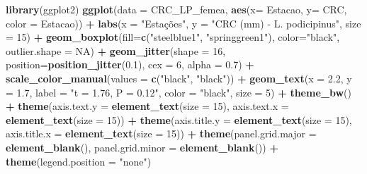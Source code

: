 \documentclass[
]{book}
\newenvironment{Shaded}{\begin{snugshade}}{\end{snugshade}}
\newcommand{\DataTypeTok}[1]{\textcolor[rgb]{0.13,0.29,0.53}{#1}}
\newcommand{\DecValTok}[1]{\textcolor[rgb]{0.00,0.00,0.81}{#1}}
\newcommand{\FloatTok}[1]{\textcolor[rgb]{0.00,0.00,0.81}{#1}}
\newcommand{\KeywordTok}[1]{\textcolor[rgb]{0.13,0.29,0.53}{\textbf{#1}}}
\newcommand{\NormalTok}[1]{#1}
\newcommand{\OperatorTok}[1]{\textcolor[rgb]{0.81,0.36,0.00}{\textbf{#1}}}
\newcommand{\OtherTok}[1]{\textcolor[rgb]{0.56,0.35,0.01}{#1}}
\newcommand{\StringTok}[1]{\textcolor[rgb]{0.31,0.60,0.02}{#1}}
\begin{document}
\begin{Shaded}
\begin{Highlighting}[]
\KeywordTok{library}\NormalTok{(ggplot2)}
\KeywordTok{ggplot}\NormalTok{(}\DataTypeTok{data =}\NormalTok{ CRC_LP_femea, }\KeywordTok{aes}\NormalTok{(}\DataTypeTok{x=}\NormalTok{ Estacao, }\DataTypeTok{y=}\NormalTok{ CRC, }\DataTypeTok{color =}\NormalTok{ Estacao)) }\OperatorTok{+}\StringTok{ }
\StringTok{  }\KeywordTok{labs}\NormalTok{(}\DataTypeTok{x =} \StringTok{"Estações"}\NormalTok{, }\DataTypeTok{y =} \StringTok{"CRC (mm) - L. podicipinus"}\NormalTok{, }\DataTypeTok{size =} \DecValTok{15}\NormalTok{) }\OperatorTok{+}
\StringTok{  }\KeywordTok{geom_boxplot}\NormalTok{(}\DataTypeTok{fill=}\KeywordTok{c}\NormalTok{(}\StringTok{"steelblue1"}\NormalTok{, }\StringTok{"springgreen1"}\NormalTok{), }\DataTypeTok{color=}\StringTok{"black"}\NormalTok{, }\DataTypeTok{outlier.shape =} \OtherTok{NA}\NormalTok{) }\OperatorTok{+}
\StringTok{  }\KeywordTok{geom_jitter}\NormalTok{(}\DataTypeTok{shape =} \DecValTok{16}\NormalTok{, }\DataTypeTok{position=}\KeywordTok{position_jitter}\NormalTok{(}\FloatTok{0.1}\NormalTok{), }\DataTypeTok{cex =} \DecValTok{6}\NormalTok{, }\DataTypeTok{alpha =} \FloatTok{0.7}\NormalTok{) }\OperatorTok{+}
\StringTok{  }\KeywordTok{scale_color_manual}\NormalTok{(}\DataTypeTok{values =} \KeywordTok{c}\NormalTok{(}\StringTok{"black"}\NormalTok{, }\StringTok{"black"}\NormalTok{)) }\OperatorTok{+}
\StringTok{  }\KeywordTok{geom_text}\NormalTok{(}\DataTypeTok{x =} \FloatTok{2.2}\NormalTok{, }\DataTypeTok{y =} \FloatTok{1.7}\NormalTok{, }\DataTypeTok{label =} \StringTok{"t = 1.76, P = 0.12"}\NormalTok{, }\DataTypeTok{color =} \StringTok{"black"}\NormalTok{, }\DataTypeTok{size =} \DecValTok{5}\NormalTok{) }\OperatorTok{+}
\StringTok{  }\KeywordTok{theme_bw}\NormalTok{() }\OperatorTok{+}
\StringTok{  }\KeywordTok{theme}\NormalTok{(}\DataTypeTok{axis.text.y =} \KeywordTok{element_text}\NormalTok{(}\DataTypeTok{size =} \DecValTok{15}\NormalTok{), }\DataTypeTok{axis.text.x =} \KeywordTok{element_text}\NormalTok{(}\DataTypeTok{size =} \DecValTok{15}\NormalTok{)) }\OperatorTok{+}
\StringTok{  }\KeywordTok{theme}\NormalTok{(}\DataTypeTok{axis.title.y =} \KeywordTok{element_text}\NormalTok{(}\DataTypeTok{size =} \DecValTok{15}\NormalTok{), }\DataTypeTok{axis.title.x =} \KeywordTok{element_text}\NormalTok{(}\DataTypeTok{size =} \DecValTok{15}\NormalTok{)) }\OperatorTok{+}
\StringTok{  }\KeywordTok{theme}\NormalTok{(}\DataTypeTok{panel.grid.major =} \KeywordTok{element_blank}\NormalTok{(), }\DataTypeTok{panel.grid.minor =} \KeywordTok{element_blank}\NormalTok{()) }\OperatorTok{+}
\StringTok{  }\KeywordTok{theme}\NormalTok{(}\DataTypeTok{legend.position =} \StringTok{"none"}\NormalTok{)}
\end{Highlighting}
\end{Shaded}
\end{document}

